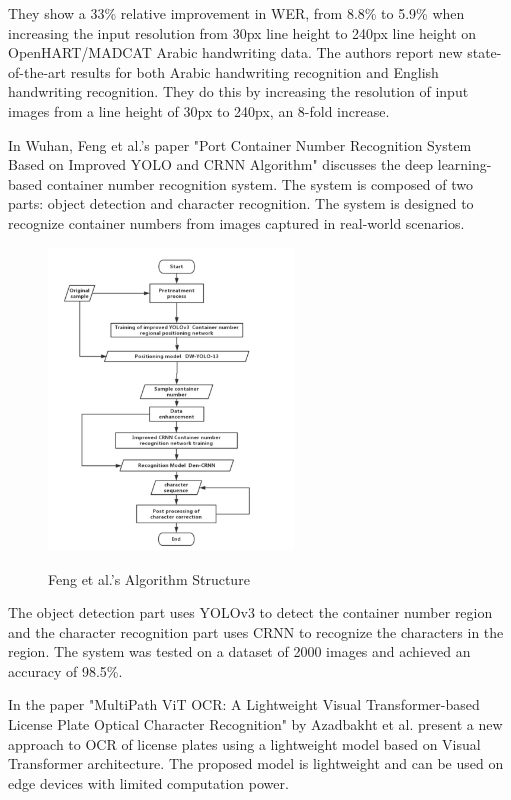 They show a 33\% relative improvement in WER, from 8.8\% to 5.9\% when increasing the input resolution from 30px line height to 240px line height on OpenHART/MADCAT Arabic handwriting data. The authors report new state-of-the-art results for both Arabic handwriting recognition and English handwriting recognition. They do this by increasing the resolution of input images from a line height of 30px to 240px, an 8-fold increase.\cite{rawlsHowEfficientlyIncrease2018}


In Wuhan, Feng et al.'s paper "Port Container Number Recognition System Based on Improved YOLO and CRNN Algorithm" discusses the deep learning-based container number recognition system. The system is composed of two parts: object detection and character recognition. The system is designed to recognize container numbers from images captured in real-world scenarios.


\begin{figure}[ht]
    \centering
    \includegraphics[width=0.58\textwidth]{Figures/CRNN_Papers/Feng_2020.jpg}
    \caption[Feng et al.'s Algorithm Structure]{Feng et al.'s Algorithm Structure}\cite{fengPortContainerNumber2020}
    \label{fig:Feng et al.'s Algorithm Structure}
\end{figure}

The object detection part uses YOLOv3 to detect the container number region and the character recognition part uses CRNN to recognize the characters in the region.  The system was tested on a dataset of 2000 images and achieved an accuracy of 98.5\%.\cite{fengPortContainerNumber2020}



In the paper "MultiPath ViT OCR: A Lightweight Visual Transformer-based License Plate Optical Character Recognition" by Azadbakht et al. present a new approach to OCR of license plates using a lightweight model based on Visual Transformer architecture. The proposed model is lightweight and can be used on edge devices with limited computation power.


